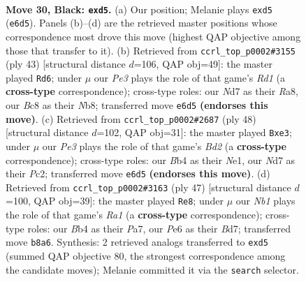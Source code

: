 \documentclass[11pt]{article}
\begin{document}
\clearpage

\begin{figure}[p]\centering
\begin{subfigure}{0.46\textwidth}\centering
\resizebox{\linewidth}{!}{%
\newchessgame
\chessboard[
  setfen={1nb5/rp1n2k1/4ppp1/p2R3p/1bN5/1P2P1PP/PBB1PK2/1R6 b - - 0 30},
  showmover=false,
  pgfstyle=straightmove, color=movearrow, markmove={e6-d5}
]}
\caption{}
\end{subfigure}\hfill
\begin{subfigure}{0.46\textwidth}\centering
\resizebox{\linewidth}{!}{%
\newchessgame
\chessboard[
  setfen={rn1r2k1/1b3p2/2p1pp1p/p1R5/3N4/1P2P1P1/5PBP/R5K1 b - - 0 22},
  showmover=false,
  pgfstyle=straightmove, color=movearrow, markmove={d8-d6}
]}
\caption{}
\end{subfigure}
\\[4pt]
\begin{subfigure}{0.46\textwidth}\centering
\resizebox{\linewidth}{!}{%
\newchessgame
\chessboard[
  setfen={2k4r/1bp5/p6p/2p1Pp2/P2p2r1/3Pn3/1PPB1RPP/R3N1K1 w - - 3 25},
  showmover=false,
  pgfstyle=straightmove, color=movearrow, markmove={d2-e3}
]}
\caption{}
\end{subfigure}\hfill
\begin{subfigure}{0.46\textwidth}\centering
\resizebox{\linewidth}{!}{%
\newchessgame
\chessboard[
  setfen={r5k1/p2b1np1/1ppb1p1p/8/P1NB4/6P1/1PP1RPBP/6K1 b - - 1 24},
  showmover=false,
  pgfstyle=straightmove, color=movearrow, markmove={a8-e8}
]}
\caption{}
\end{subfigure}
\caption{\textbf{Move 30, Black: \texttt{exd5}.} (a) Our position; Melanie plays \texttt{exd5} (\texttt{e6d5}). Panels (b)--(d) are the retrieved master positions whose correspondence most drove this move (highest QAP objective among those that transfer to it). (b) Retrieved from \texttt{ccrl\_top\_p0002\#3155} (ply 43) [structural distance $d$=106, QAP obj=49]: the master played \texttt{Rd6}; under $\mu$ our \emph{Pe3} plays the role of that game's \emph{Rd1} (a \textbf{cross-type} correspondence); cross-type roles: our \emph{N}d7 as their \emph{R}a8, our \emph{B}c8 as their \emph{N}b8; transferred move \texttt{e6d5} \textbf{(endorses this move)}. (c) Retrieved from \texttt{ccrl\_top\_p0002\#2687} (ply 48) [structural distance $d$=102, QAP obj=31]: the master played \texttt{Bxe3}; under $\mu$ our \emph{Pe3} plays the role of that game's \emph{Bd2} (a \textbf{cross-type} correspondence); cross-type roles: our \emph{B}b4 as their \emph{N}e1, our \emph{N}d7 as their \emph{P}c2; transferred move \texttt{e6d5} \textbf{(endorses this move)}. (d) Retrieved from \texttt{ccrl\_top\_p0002\#3163} (ply 47) [structural distance $d$=100, QAP obj=39]: the master played \texttt{Re8}; under $\mu$ our \emph{Nb1} plays the role of that game's \emph{Ra1} (a \textbf{cross-type} correspondence); cross-type roles: our \emph{B}b4 as their \emph{P}a7, our \emph{P}e6 as their \emph{B}d7; transferred move \texttt{b8a6}. Synthesis: 2 retrieved analogs transferred to \texttt{exd5} (summed QAP objective 80, the strongest correspondence among the candidate moves); Melanie committed it via the \texttt{search} selector.}
\label{fig:thought-m59}
\end{figure}
\end{document}
